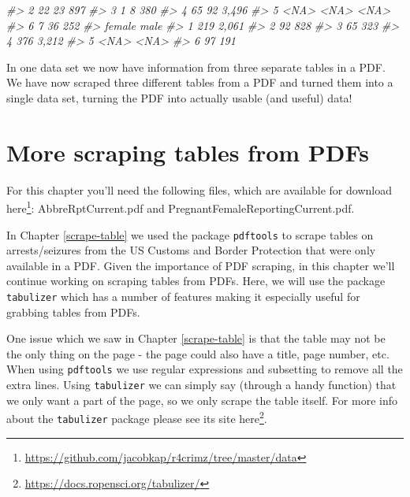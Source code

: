 \documentclass[
]{krantz}
\makeatletter
\newenvironment{Shaded}{\begin{snugshade}}{\end{snugshade}}
\newcommand{\CommentTok}[1]{\textcolor[rgb]{0.37,0.37,0.37}{\textit{#1}}}
\renewcommand{\href}[2]{#2\footnote{\url{#1}}}
\newenvironment{kframe}{%
\medskip{}
\setlength{\fboxsep}{.8em}
 \def\at@end@of@kframe{}%
 \ifinner\ifhmode%
  \def\at@end@of@kframe{\end{minipage}}%
  \begin{minipage}{\columnwidth}%
 \fi\fi%
 \def\FrameCommand##1{\hskip\@totalleftmargin \hskip-\fboxsep
 \colorbox{shadecolor}{##1}\hskip-\fboxsep
     \hskip-\linewidth \hskip-\@totalleftmargin \hskip\columnwidth}%
 \MakeFramed {\advance\hsize-\width
   \@totalleftmargin\z@ \linewidth\hsize
   \@setminipage}}%
 {\par\unskip\endMakeFramed%
 \at@end@of@kframe}
\renewenvironment{Shaded}{\begin{kframe}}{\end{kframe}}
\makeatother
\begin{document}
\begin{Shaded}
\begin{Highlighting}[]
\CommentTok{\#\textgreater{} 2                      22              23          897}
\CommentTok{\#\textgreater{} 3                       1               8          380}
\CommentTok{\#\textgreater{} 4                      65              92        3,496}
\CommentTok{\#\textgreater{} 5                    \textless{}NA\textgreater{}            \textless{}NA\textgreater{}         \textless{}NA\textgreater{}}
\CommentTok{\#\textgreater{} 6                       7              36          252}
\CommentTok{\#\textgreater{}   female  male}
\CommentTok{\#\textgreater{} 1    219 2,061}
\CommentTok{\#\textgreater{} 2     92   828}
\CommentTok{\#\textgreater{} 3     65   323}
\CommentTok{\#\textgreater{} 4    376 3,212}
\CommentTok{\#\textgreater{} 5   \textless{}NA\textgreater{}  \textless{}NA\textgreater{}}
\CommentTok{\#\textgreater{} 6     97   191}
\end{Highlighting}
\end{Shaded}

In one data set we now have information from three separate
tables in a PDF. We have now scraped three different tables
from a PDF and turned them into a single data set, turning
the PDF into actually usable (and useful) data!

\hypertarget{scrape-table2}{%
\chapter{More scraping tables from
PDFs}\label{scrape-table2}}

For this chapter you'll need the following files, which are
available for download
\href{https://github.com/jacobkap/r4crimz/tree/master/data}{here}:
AbbreRptCurrent.pdf and PregnantFemaleReportingCurrent.pdf.

In Chapter \ref{scrape-table} we used the package
\texttt{pdftools} to scrape tables on arrests/seizures from
the US Customs and Border Protection that were only
available in a PDF. Given the importance of PDF scraping, in
this chapter we'll continue working on scraping tables from
PDFs. Here, we will use the package \texttt{tabulizer} which
has a number of features making it especially useful for
grabbing tables from PDFs.

One issue which we saw in Chapter \ref{scrape-table} is that
the table may not be the only thing on the page - the page
could also have a title, page number, etc. When using
\texttt{pdftools} we use regular expressions and subsetting
to remove all the extra lines. Using \texttt{tabulizer} we
can simply say (through a handy function) that we only want
a part of the page, so we only scrape the table itself. For
more info about the \texttt{tabulizer} package please see
its site \href{https://docs.ropensci.org/tabulizer/}{here}.
\end{document}

